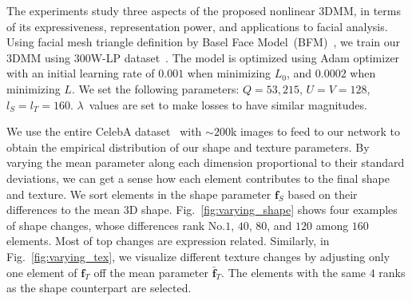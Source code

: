 \label{sec:exp}

The experiments study three aspects of the proposed nonlinear 3DMM, in terms of its expressiveness, representation power, and applications to facial analysis.
Using facial mesh triangle definition by Basel Face Model~(BFM)~\cite{paysan20093d}, we train our 3DMM using 300W-LP dataset~\cite{zhu2016face}. 
The model is optimized using Adam optimizer with an initial learning rate of $0.001$ when minimizing $L_0$, and $0.0002$ when minimizing $L$.
We set the following parameters: $Q=53,215$, $U=V=128$, $l_S=l_T=160$. $\lambda$~values are set to make losses to have similar magnitudes.


We use the entire CelebA dataset~\cite{liu2015faceattributes} with ${\sim}200$k images to feed to our network to obtain the empirical distribution of our shape and texture parameters. 
By varying the mean parameter along each dimension proportional to their standard deviations, we can get a sense how each element contributes to the final shape and texture.
We sort elements in the shape parameter $\mathbf{f}_S$ based on their differences to the mean 3D shape. 
Fig.~\ref{fig:varying_shape} shows four examples of shape changes, whose differences rank No.$1$, $40$, $80$, and $120$ among $160$ elements.
%
Most of top changes are expression related.
Similarly, in Fig.~\ref{fig:varying_tex}, we visualize different texture changes by adjusting only one element of $\mathbf{f}_T$ off the mean parameter $\bar{\mathbf{f}}_T$.
The elements with the same $4$ ranks as the shape counterpart are selected.


